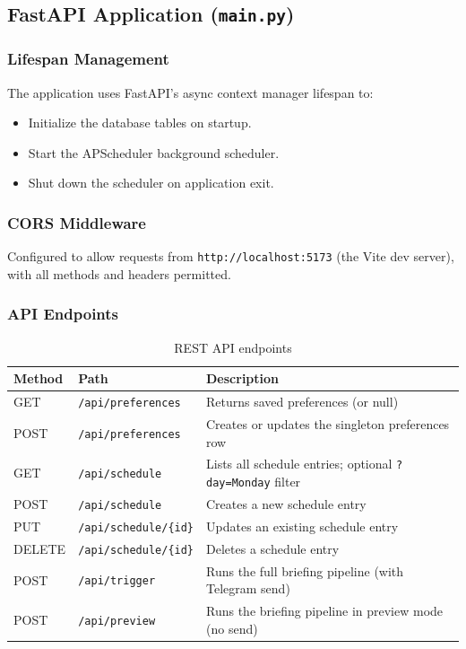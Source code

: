 \documentclass[12pt, a4paper]{article}
\begin{document}
\subsection{FastAPI Application (\texttt{main.py})}

\subsubsection{Lifespan Management}

The application uses FastAPI's async context manager lifespan to:
\begin{itemize}[leftmargin=2em]
  \item Initialize the database tables on startup.
  \item Start the APScheduler background scheduler.
  \item Shut down the scheduler on application exit.
\end{itemize}

\subsubsection{CORS Middleware}

Configured to allow requests from \texttt{http://localhost:5173} (the Vite dev server), with all methods and headers permitted.

\subsubsection{API Endpoints}

\begin{table}[h!]
\centering
\begin{tabular}{@{}llp{7cm}@{}}
\toprule
\textbf{Method} & \textbf{Path} & \textbf{Description} \\
\midrule
GET    & \texttt{/api/preferences}       & Returns saved preferences (or null) \\
POST   & \texttt{/api/preferences}       & Creates or updates the singleton preferences row \\
GET    & \texttt{/api/schedule}           & Lists all schedule entries; optional \texttt{?day=Monday} filter \\
POST   & \texttt{/api/schedule}           & Creates a new schedule entry \\
PUT    & \texttt{/api/schedule/\{id\}}    & Updates an existing schedule entry \\
DELETE & \texttt{/api/schedule/\{id\}}    & Deletes a schedule entry \\
POST   & \texttt{/api/trigger}            & Runs the full briefing pipeline (with Telegram send) \\
POST   & \texttt{/api/preview}            & Runs the briefing pipeline in preview mode (no send) \\
\bottomrule
\end{tabular}
\caption{REST API endpoints}
\end{table}
\end{document}
